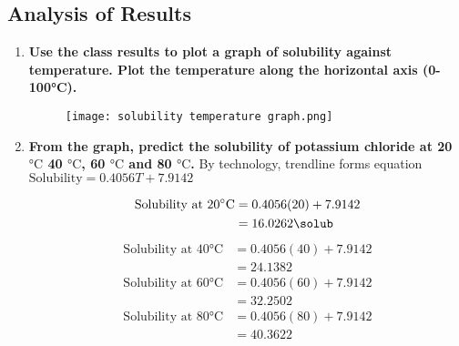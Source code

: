 	\subsection{Analysis of Results}
		\begin{enumerate}
			\item \textbf{Use the class results to plot a graph of solubility against temperature. Plot the temperature along the horizontal axis (0-100°C).}
			\begin{figure}[H]
				\centering
				\texttt{[image: solubility temperature graph.png]}
			\end{figure}
			\item \textbf{From the graph, predict the solubility of potassium chloride at 20 $\unit{\degreeCelsius}$ 40 $\unit{\degreeCelsius}$, 60 $\unit{\degreeCelsius}$ and 80 $\unit{\degreeCelsius}$.}
				\subitem By technology, trendline forms equation $\text{Solubility} = 0.4056T + 7.9142$

				\begin{align*}
					\text{Solubility at 20} \unit{\degreeCelsius} &= 0.4056(20) + 7.9142 \\
					&= 16.0262 \unit{\solub}
				\end{align*}
				\begin{align*}
					\text{Solubility at 40} \unit{\degreeCelsius} &= 0.4056(40) + 7.9142 \\
					&= 24.1382
				\end{align*}
				\begin{align*}
					\text{Solubility at 60} \unit{\degreeCelsius} &= 0.4056(60) + 7.9142 \\
					&= 32.2502
				\end{align*}
				\begin{align*}
					\text{Solubility at 80} \unit{\degreeCelsius} &= 0.4056(80) + 7.9142 \\
					&= 40.3622
				\end{align*}
		\end{enumerate}

	\newpage

